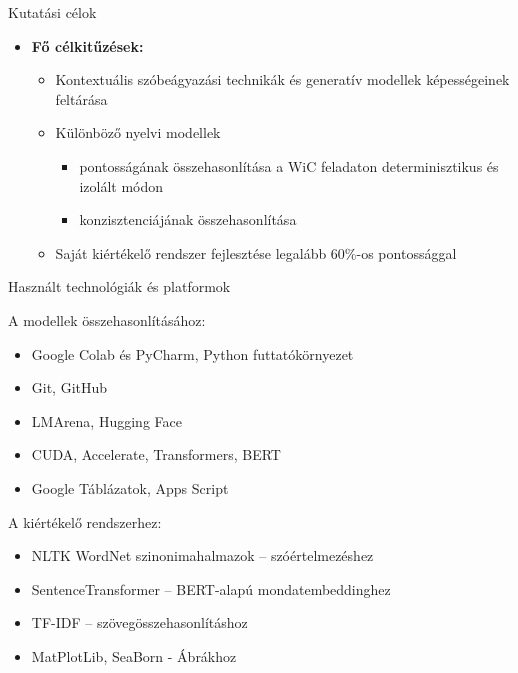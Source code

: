 \documentclass{beamer}
\begin{document}
    \begin{frame}{Kutatási célok}
        \begin{itemize}
            \item \textbf{Fő célkitűzések:}
            \begin{itemize}
                \item Kontextuális szóbeágyazási technikák és generatív modellek képességeinek feltárása
                \item Különböző nyelvi modellek
                \begin{itemize}
                    \item pontosságának összehasonlítása a WiC feladaton determinisztikus és izolált módon
                    \item konzisztenciájának összehasonlítása
                \end{itemize}
                \item Saját kiértékelő rendszer fejlesztése legalább 60\%-os pontossággal
            \end{itemize}
        \end{itemize}
    \end{frame}

    \begin{frame}{Használt technológiák és platformok}

        A modellek összehasonlításához:
        \begin{itemize}
            \item Google Colab és PyCharm, Python futtatókörnyezet
            \item Git, GitHub
            \item LMArena, Hugging Face
            \item CUDA, Accelerate, Transformers, BERT
            \item Google Táblázatok, Apps Script
        \end{itemize}
        A kiértékelő rendszerhez:
        \begin{itemize}
            \item NLTK WordNet szinonimahalmazok – szóértelmezéshez

            \item SentenceTransformer – BERT-alapú mondatembeddinghez

            \item TF-IDF – szövegösszehasonlításhoz %

            \item MatPlotLib, SeaBorn - Ábrákhoz
        \end{itemize}
    \end{frame}
\end{document}
